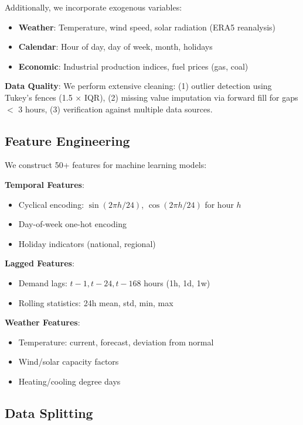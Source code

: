 \documentclass[12pt,a4paper]{article}
\begin{document}
Additionally, we incorporate exogenous variables:

\begin{itemize}
    \item \textbf{Weather}: Temperature, wind speed, solar radiation (ERA5 reanalysis)
    \item \textbf{Calendar}: Hour of day, day of week, month, holidays
    \item \textbf{Economic}: Industrial production indices, fuel prices (gas, coal)
\end{itemize}

\textbf{Data Quality}: We perform extensive cleaning: (1) outlier detection using Tukey's fences (1.5 $\times$ IQR), (2) missing value imputation via forward fill for gaps $<$ 3 hours, (3) verification against multiple data sources.

\subsection{Feature Engineering}

We construct 50+ features for machine learning models:

\textbf{Temporal Features}:
\begin{itemize}
    \item Cyclical encoding: $\sin(2\pi h/24)$, $\cos(2\pi h/24)$ for hour $h$
    \item Day-of-week one-hot encoding
    \item Holiday indicators (national, regional)
\end{itemize}

\textbf{Lagged Features}:
\begin{itemize}
    \item Demand lags: $t-1, t-24, t-168$ hours (1h, 1d, 1w)
    \item Rolling statistics: 24h mean, std, min, max
\end{itemize}

\textbf{Weather Features}:
\begin{itemize}
    \item Temperature: current, forecast, deviation from normal
    \item Wind/solar capacity factors
    \item Heating/cooling degree days
\end{itemize}

\subsection{Data Splitting}
\end{document}

